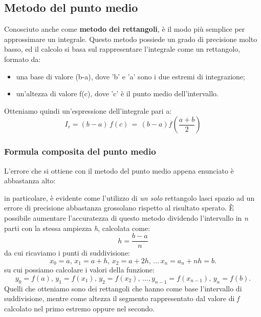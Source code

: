 \documentclass{article}
\begin{document}
\subsection{Metodo del punto medio}
Conosciuto anche come \textbf{metodo dei rettangoli}, è il modo più semplice per approssimare un integrale.
Questo metodo possiede un grado di precisione molto basso, ed il calcolo si basa sul rappresentare l'integrale come un rettangolo, formato da:
\begin{itemize}
   \item una base di valore (b-a), dove 'b' e 'a' sono i due estremi di integrazione;
   \item un'altezza di valore f(c), dove 'c' è il punto medio dell'intervallo.
\end{itemize}
Otteniamo quindi un'espressione dell'integrale pari a:
\begin{equation*}
   I_{r} = (b-a)\,f(c)\,=\,(b-a)f \left( \frac{a+b}{2}  \right)
\end{equation*}
\subsubsection{Formula composita del punto medio}
L'errore che si ottiene con il metodo del punto medio appena enunciato è abbastanza alto:

in particolare, è evidente come l'utilizzo di \textit{un solo} rettangolo lasci spazio ad un errore di precisione abbastanza grossolano rispetto al risultato sperato.
È possibile aumentare l'accuratezza di questo metodo dividendo l'intervallo in \textit{n} parti con  la stessa ampiezza \textit{h}, calcolata come:
\begin{equation*}
   h = \frac{b-a}{n}
\end{equation*}
da cui ricaviamo i punti di suddivisione:
\begin{equation*}
   x_0 = a,\,x_1 = a+h,\, x_2 = a + 2h,\,...\,x_n = a_n + nh = b.
\end{equation*}
su cui possiamo calcolare i valori della funzione:
\begin{equation*}
   y_0 = f(a),\,y_1 = f(x_1),\,y_2 = f(x_2),\,...,y_{n-1} = f(x_{n-1}),\,y_n = f(b).
\end{equation*}
Quelli che otteniamo sono dei rettangoli che hanno come base l'intervallo di suddivisione, mentre come altezza il segmento rappresentato dal valore di \textit{f} calcolato 
nel primo estremo oppure nel secondo.
\end{document}

